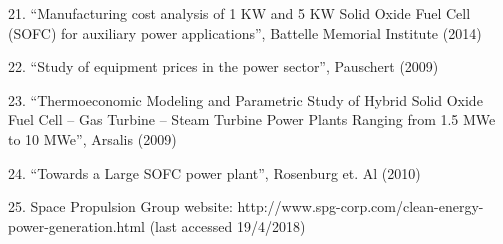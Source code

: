 21. “Manufacturing cost analysis of 1 KW and 5 KW Solid Oxide Fuel Cell (SOFC) for auxiliary power applications”, Battelle Memorial Institute (2014)

22. “Study of equipment prices in the power sector”, Pauschert (2009)

23. “Thermoeconomic Modeling and Parametric Study of Hybrid Solid Oxide Fuel Cell – Gas Turbine – Steam Turbine Power Plants Ranging from 1.5 MWe to 10 MWe”, Arsalis (2009)

24. “Towards a Large SOFC power plant”, Rosenburg et. Al (2010)

25. Space Propulsion Group website: http://www.spg-corp.com/clean-energy-power-generation.html (last accessed 19/4/2018)



%

